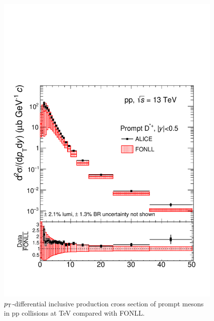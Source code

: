 \begin{figure}[htbp]
\begin{center}
\includegraphics[width=1\textwidth]{figures/Dstar/pp13TeV/cross-section-pp13TeV-final-systematics.pdf}
\caption{$p_{\rm T}$-differential inclusive production cross section of prompt \Dstar mesons in pp collisions at  TeV compared with FONLL.}
\label{fig:DmesonCorrYieldsModel}
\end{center}
\end{figure}
